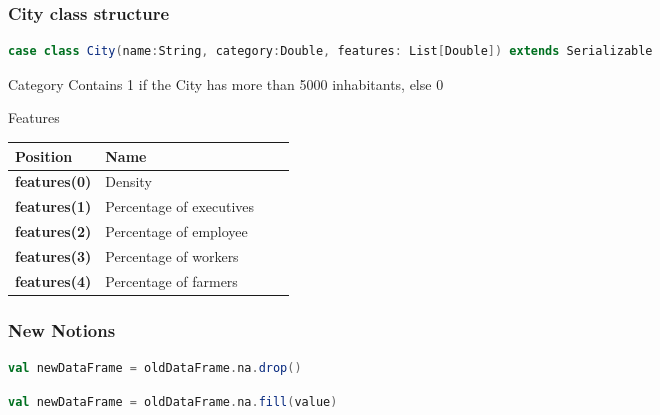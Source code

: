 \documentclass[slidetop,9pt,utf8]{beamer}
\begin{document}
\begin{CJK}{UTF8}{gbsn}
\begin{frame}[fragile]
  \frametitle{City class structure}

  \begin{lstlisting}[label=CityClassOverview, caption=psug.hands.on.exercise05.City class overview, language=scala, style=code]
case class City(name:String, category:Double, features: List[Double]) extends Serializable
  \end{lstlisting}

  \begin{block}{Category}
    Contains 1 if the City has more than 5000 inhabitants, else 0
  \end{block}

  \begin{block}{Features}
    \begin{center}
      \begin{tabular}{|l|l|l|l|}
            \hline 
            \rowcolor{gray} \textbf{Position} & \textbf{Name} \\ \hline
            \textbf{features(0)} & Density \\ \hline
            \textbf{features(1)} & Percentage of executives \\ \hline
            \textbf{features(2)} & Percentage of employee \\ \hline
            \textbf{features(3)} & Percentage of workers \\ \hline
            \textbf{features(4)} & Percentage of farmers \\ \hline
      \end{tabular}
    \end{center}
  \end{block}

\end{frame}

\begin{frame}[fragile]
  \frametitle{New Notions}

  \begin{lstlisting}[label=DropNullValue, caption=Drop row containing null values, language=scala, style=code]
val newDataFrame = oldDataFrame.na.drop()
  \end{lstlisting}

  \begin{lstlisting}[label=FillNullValue, caption=Fill row containing null values, language=scala, style=code]
val newDataFrame = oldDataFrame.na.fill(value)
  \end{lstlisting}

\end{frame}


\end{CJK}
\end{document}
